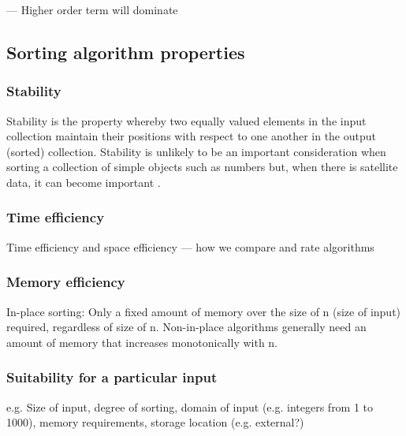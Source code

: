 \documentclass[12pt, a4paper]{article}
\begin{document}
--- Higher order term will dominate 

\subsection{Sorting algorithm properties}

\subsubsection{Stability}

Stability is the property whereby two equally valued elements in the input collection maintain their positions with respect to one another in the output (sorted) collection. Stability is unlikely to be an important consideration when sorting a collection of simple objects such as numbers but, when there is satellite data, it can become important \autocite{cormen01}.

\subsubsection{Time efficiency}
Time efficiency and space efficiency --- how we compare and rate algorithms



\subsubsection{Memory efficiency}
In-place sorting: Only a fixed amount of memory over the size of n (size of input) required, regardless of size of n. Non-in-place algorithms generally need an amount of memory that increases monotonically with n.

\subsubsection{Suitability for a particular input}

e.g. Size of input, degree of sorting, domain of input (e.g. integers from 1 to 1000), memory requirements, storage location (e.g. external?)
\end{document}
